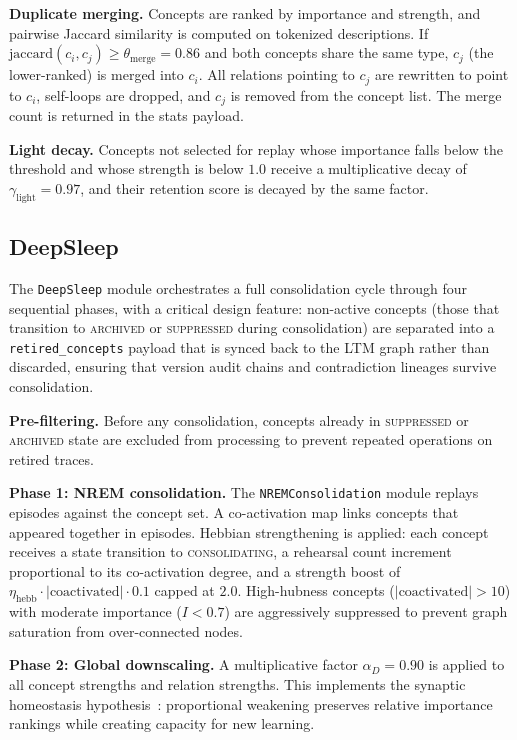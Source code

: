 \documentclass[11pt,twocolumn]{article}
\begin{document}
\textbf{Duplicate merging.} Concepts are ranked by importance and strength, and pairwise Jaccard similarity is computed on tokenized descriptions. If $\text{jaccard}(c_i, c_j) \geq \theta_{\text{merge}} = 0.86$ and both concepts share the same type, $c_j$ (the lower-ranked) is merged into $c_i$. All relations pointing to $c_j$ are rewritten to point to $c_i$, self-loops are dropped, and $c_j$ is removed from the concept list. The merge count is returned in the stats payload.

\textbf{Light decay.} Concepts not selected for replay whose importance falls below the threshold and whose strength is below $1.0$ receive a multiplicative decay of $\gamma_{\text{light}} = 0.97$, and their retention score is decayed by the same factor.

\subsection{DeepSleep}

The \texttt{DeepSleep} module orchestrates a full consolidation cycle through four sequential phases, with a critical design feature: non-active concepts (those that transition to \textsc{archived} or \textsc{suppressed} during consolidation) are separated into a \texttt{retired\_concepts} payload that is synced back to the LTM graph rather than discarded, ensuring that version audit chains and contradiction lineages survive consolidation.

\textbf{Pre-filtering.} Before any consolidation, concepts already in \textsc{suppressed} or \textsc{archived} state are excluded from processing to prevent repeated operations on retired traces.

\textbf{Phase 1: NREM consolidation.} The \texttt{NREMConsolidation} module replays episodes against the concept set. A co-activation map links concepts that appeared together in episodes. Hebbian strengthening is applied: each concept receives a state transition to \textsc{consolidating}, a rehearsal count increment proportional to its co-activation degree, and a strength boost of $\eta_{\text{hebb}} \cdot |\text{coactivated}| \cdot 0.1$ capped at $2.0$. High-hubness concepts ($|\text{coactivated}| > 10$) with moderate importance ($I < 0.7$) are aggressively suppressed to prevent graph saturation from over-connected nodes.

\textbf{Phase 2: Global downscaling.} A multiplicative factor $\alpha_D = 0.90$ is applied to all concept strengths and relation strengths. This implements the synaptic homeostasis hypothesis~\cite{tononi2003sleep}: proportional weakening preserves relative importance rankings while creating capacity for new learning.
\end{document}
